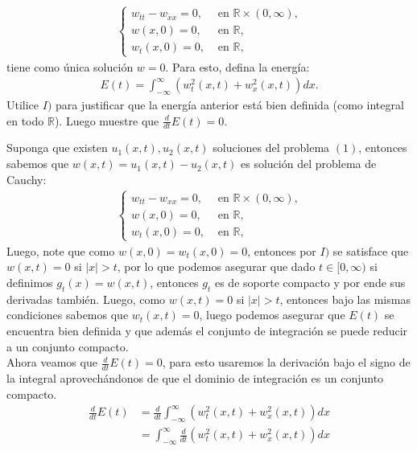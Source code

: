 \begin{homeworkProblem}
\begin{enumerate}[i]
\begin{align*}
\begin{cases}
        w_{tt}-w_{xx}=0, &\text{ en } \mathbb{R}\times (0,\infty) \text{,} \\
        w(x,0)=0, &\text{ en }\mathbb{R} \text{,}\\
        w_{t}(x,0)=0, &\text{ en }\mathbb{R} \text{,}
      \end{cases}
    \end{align*}
    tiene como única solución $w=0$. Para esto, defina la energía:
    \begin{align*}
      E(t)=\int_{-\infty}^{\infty}(w_{t}^2(x,t)+w_{x}^2(x,t))dx.
    \end{align*}
    Utilice $I)$ para justificar que la energía anterior está bien definida (como integral en todo $\mathbb{R}$). Luego muestre que $\frac{d}{dt}E(t)=0$.
      \begin{solucion}
        Suponga que existen $u_1(x,t),u_2(x,t)$ soluciones del problema $(1)$, entonces sabemos que $w(x,t)=u_1(x,t)-u_2(x,t)$ es solución del problema de Cauchy:
            \begin{align*}
              \begin{cases}
                w_{tt}-w_{xx}=0, &\text{ en } \mathbb{R}\times (0,\infty) \text{,} \\
                w(x,0)=0, &\text{ en }\mathbb{R} \text{,}\\
                w_{t}(x,0)=0, &\text{ en }\mathbb{R} \text{,}
              \end{cases}
            \end{align*}
            Luego, note que como $w(x,0)=w_t(x,0)=0$, entonces por $I)$ se satisface que $w(x,t)=0$ si $|x|>t$, por lo que podemos asegurar que dado $t\in[0,\infty)$ si definimos $g_t(x)=w(x,t)$, entonces $g_t$ es de soporte compacto y por ende sus derivadas también. Luego, como $w(x,t)=0$ si $|x|>t$, entonces bajo las mismas condiciones sabemos que $w_t(x,t)=0$, luego podemos asegurar que $E(t)$ se encuentra bien definida y que además el conjunto de integración se puede reducir a un conjunto compacto.\\
            \newpage
            Ahora veamos que $\frac{d}{dt}E(t)=0$, para esto usaremos la derivación bajo el signo de la integral aprovechándonos de que el dominio de integración es un conjunto compacto.
            \begin{align*}
              \frac{d}{dt}E(t)&=\frac{d}{dt}\int_{-\infty}^{\infty}(w_t^2(x,t)+w_x^2(x,t))dx\\
              &=\int_{-\infty}^{\infty}\frac{d}{dt}(w_t^2(x,t)+w_x^2(x,t))dx\\

\end{align*}
\end{solucion}
\end{enumerate}
\end{homeworkProblem}
